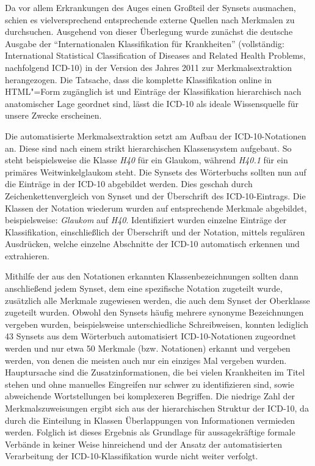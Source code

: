 \documentclass[pagesize,paper=A4,DIV=calc,fontsize=12pt,draft=false]{scrreprt}
\begin{document}
Da vor allem Erkrankungen des Auges einen Großteil der Synsets ausmachen, schien es vielversprechend entsprechende externe Quellen nach Merkmalen zu durchsuchen. 
Ausgehend von dieser Überlegung wurde zunächst die deutsche Ausgabe der \enquote{Internationalen Klassifikation für Krankheiten} (vollständig: International Statistical Classification of Diseases and Related Health Problems, nachfolgend ICD-10) in der Version des Jahres 2011 zur Merkmalsextraktion herangezogen. 
Die Tatsache, dass die komplette Klassifikation online in HTML"=Form zugänglich ist und Einträge der Klassifikation hierarchisch nach anatomischer Lage geordnet sind, lässt die ICD-10 als ideale Wissensquelle für unsere Zwecke erscheinen. 

Die automatisierte Merkmalsextraktion setzt am Aufbau der ICD-10-Notationen an. 
Diese sind nach einem strikt hierarchischen Klassensystem aufgebaut. 
So steht beispielsweise die Klasse \emph{H40} für ein Glaukom, während \emph{H40.1} für ein primäres Weitwinkelglaukom steht. 
Die Synsets des Wörterbuchs sollten nun auf die Einträge in der ICD-10 abgebildet werden. 
Dies geschah durch Zeichenkettenvergleich von Synset und der Überschrift des ICD-10-Eintrags. 
Die Klassen der Notation wiederum wurden auf entsprechende Merkmale abgebildet, beispielsweise: \emph{Glaukom} auf \emph{H40}. 
Identifiziert wurden einzelne Einträge der Klassifikation, einschließlich der Überschrift und der Notation, mittels regulären Ausdrücken, welche einzelne Abschnitte der ICD-10 automatisch erkennen und extrahieren. 

Mithilfe der aus den Notationen erkannten Klassenbezeichnungen sollten dann anschließend jedem Synset, dem eine spezifische Notation zugeteilt wurde, zusätzlich alle Merkmale zugewiesen werden, die auch dem Synset der Oberklasse zugeteilt wurden. 
Obwohl den Synsets häufig mehrere synonyme Bezeichnungen vergeben wurden, beispielsweise unterschiedliche Schreibweisen, konnten lediglich 43 Synsets aus dem Wörterbuch automatisiert ICD-10-Notationen zugeordnet werden und nur etwa 50 Merkmale (bzw. Notationen) erkannt und vergeben werden, von denen die meisten auch nur ein einziges Mal vergeben wurden.  
Hauptursache sind die Zusatzinformationen, die bei vielen Krankheiten im Titel stehen und ohne manuelles Eingreifen nur schwer zu identifizieren sind, sowie abweichende Wortstellungen bei komplexeren Begriffen. 
Die niedrige Zahl der Merkmalszuweisungen ergibt sich aus der hierarchischen Struktur der ICD-10, da durch die Einteilung in Klassen Überlappungen von Informationen vermieden werden. 
Folglich ist dieses Ergebnis als Grundlage für aussagekräftige formale Verbände in keiner Weise hinreichend und der Ansatz der automatisierten Verarbeitung der ICD-10-Klassifikation wurde nicht weiter verfolgt. 
\end{document}
